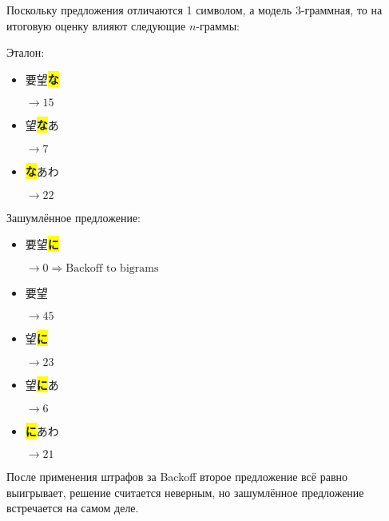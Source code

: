 Поскольку предложения отличаются 1 символом, а модель 3-граммная, то на итоговую оценку влияют следующие $n$-граммы:

Эталон:
\begin{itemize}
	\item \begin{CJK}{UTF8}{min} 要望\colorbox{yellow}{\textbf{な}} \end{CJK}  $ \rightarrow 15$
	\item \begin{CJK}{UTF8}{min} 望\colorbox{yellow}{\textbf{な}}あ  \end{CJK} $ \rightarrow 7$
	\item \begin{CJK}{UTF8}{min} \colorbox{yellow}{\textbf{な}}あわ  \end{CJK} $ \rightarrow 22$
\end{itemize}

Зашумлённое предложение:
\begin{itemize}
\item \begin{CJK}{UTF8}{min} 要望\colorbox{yellow}{\textbf{に}}  \end{CJK} $ \rightarrow 0 \Rightarrow \text{Backoff to bigrams}$
\item \begin{CJK}{UTF8}{min} 要望  \end{CJK} $ \rightarrow 45$
\item \begin{CJK}{UTF8}{min} 望\colorbox{yellow}{\textbf{に}}  \end{CJK} $ \rightarrow 23$
\item \begin{CJK}{UTF8}{min} 望\colorbox{yellow}{\textbf{に}}あ \end{CJK} $ \rightarrow 6$
\item \begin{CJK}{UTF8}{min} \colorbox{yellow}{\textbf{に}}あわ  \end{CJK} $ \rightarrow 21$
\end{itemize}

После применения штрафов за Backoff второе предложение всё равно выигрывает, решение считается неверным, но зашумлённое предложение встречается на самом деле.
